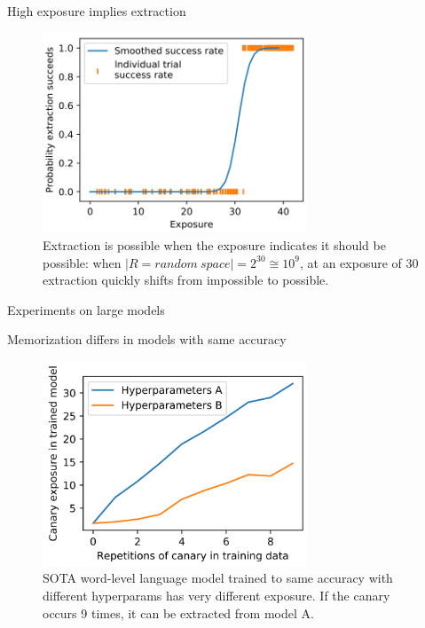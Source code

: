 \documentclass{beamer}
\begin{document}
\begin{frame}{High exposure implies extraction}

\begin{figure}[h]
\includegraphics[width=0.7\textwidth]{img/extraction}
\caption{Extraction is possible when the exposure indicates it should be possible: when $|R=random\ space| = 2^{30} \cong 10^9$, at an exposure of 30 extraction quickly shifts from impossible to possible.}
\end{figure}

\end{frame}
\begin{frame}{Experiments on large models}

\end{frame}
\begin{frame}{Memorization differs in models with same accuracy}

\begin{figure}[h]
\includegraphics[width=0.7\textwidth]{img/fig1}
\caption{SOTA word-level language model trained to same accuracy with different hyperparams has very different exposure. If the canary occurs 9 times, it can be extracted from model A.}
\end{figure}

\end{frame}
\end{document}
